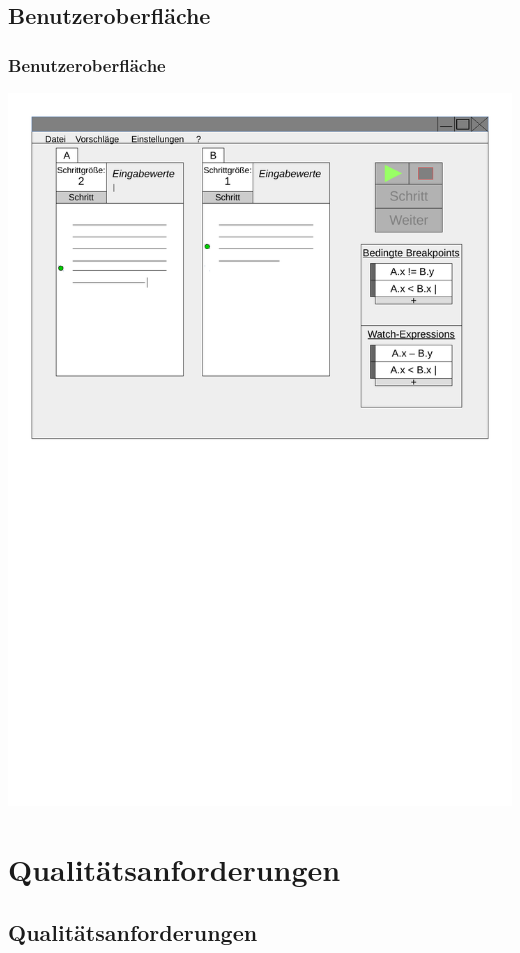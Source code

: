 \documentclass{beamer}
\begin{document}
\subsection{Benutzeroberfläche}
\begin{frame}
\frametitle{Benutzeroberfläche}
\includegraphics[scale=0.45]{../skizzeEdit}
\end{frame}



\section{Qualitätsanforderungen}
\subsection{Qualitätsanforderungen}
\end{document}
